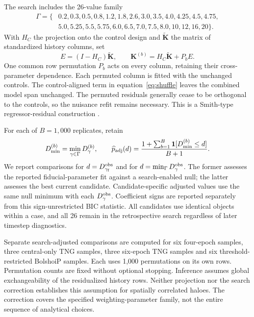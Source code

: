 \documentclass[11pt,a4paper]{article}
\begin{document}
The search includes the 26-value family
\begin{align*}
\Gamma=\{&0.2,0.3,0.5,0.8,1.2,1.8,2.6,3.0,3.5,4.0,4.25,4.5,4.75,\\
&5.0,5.25,5.5,5.75,6.0,6.5,7.0,7.5,8.0,10,12,16,20\}.
\end{align*}
With $H_C$ the projection onto the control design and $\widetilde{\boldsymbol K}$ the matrix of standardized history columns, set
\begin{equation}
E=(I-H_C)\widetilde{\boldsymbol K},\qquad
\boldsymbol K^{(b)}=H_C\widetilde{\boldsymbol K}+P_bE.\label{eq:shuffle}
\end{equation}
One common row permutation $P_b$ acts on every column, retaining their cross-parameter dependence. Each permuted column is fitted with the unchanged controls. The control-aligned term in equation~\eqref{eq:shuffle} leaves the combined model span unchanged. The permuted residuals generally cease to be orthogonal to the controls, so the nuisance refit remains necessary. This is a Smith-type regressor-residual construction \citep{Winkler2014}.

For each of $B=1,000$ replicates, retain
\begin{equation}
D_{\min}^{(b)}=\min_{\gamma\in\Gamma}D_\gamma^{(b)},\qquad
\widehat p_{\rm adj}(d)=\frac{1+\sum_{b=1}^{B}\mathbf1[D_{\min}^{(b)}\leq d]}{B+1}.\label{eq:p}
\end{equation}
We report comparisons for $d=D_{\gamma_{\rm f}}^{\rm obs}$ and for $d=\min_\Gamma D_\gamma^{\rm obs}$. The former assesses the reported fiducial-parameter fit against a search-enabled null; the latter assesses the best current candidate. Candidate-specific adjusted values use the same null minimum with each $D_\gamma^{\rm obs}$. Coefficient signs are reported separately from this sign-unrestricted BIC statistic. All candidates use identical objects within a case, and all 26 remain in the retrospective search regardless of later timestep diagnostics.

Separate search-adjusted comparisons are computed for six four-epoch samples, three central-only TNG samples, three six-epoch TNG samples and six threshold-restricted BolshoiP samples. Each uses 1,000 permutations on its own rows. Permutation counts are fixed without optional stopping. Inference assumes global exchangeability of the residualized history rows. Neither projection nor the search correction establishes this assumption for spatially correlated haloes. The correction covers the specified weighting-parameter family, not the entire sequence of analytical choices.
\end{document}

